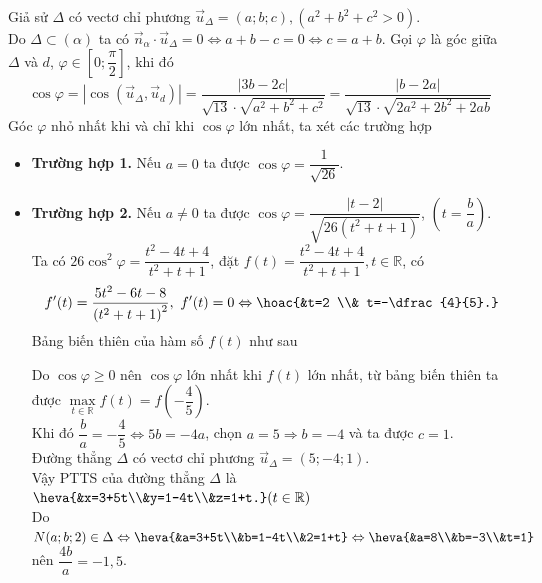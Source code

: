\begin{ex}
{\begin{itemize}
			Giả sử $\Delta$ có vectơ chỉ phương $\overrightarrow{u}_{\Delta}=(a ; b ; c),\left(a^2+b^2+c^2>0\right)$.\\
			Do $\Delta \subset(\alpha)$ ta có $\overrightarrow{n}_\alpha \cdot \overrightarrow{u}_{\Delta}=0 \Leftrightarrow a+b-c=0 \Leftrightarrow c=a+b$.
			Gọi $\varphi$ là góc giữa $\Delta$ và $d$, $\varphi \in\left[0 ; \dfrac{\pi}{2}\right]$, khi đó
			$$
			\cos \varphi=\left|\cos \left(\overrightarrow{u}_{\Delta}, \overrightarrow{u}_d\right)\right|=\dfrac{|3 b-2 c|}{\sqrt{13} \cdot \sqrt{a^2+b^2+c^2}}=\dfrac{|b-2 a|}{\sqrt{13} \cdot \sqrt{2 a^2+2 b^2+2 a b}}
			$$
			Góc $\varphi$ nhỏ nhất khi và chỉ khi $\cos \varphi$ lớn nhất, ta xét các trường hợp
			\begin{itemize}
				\item \textbf{Trường hợp 1.} Nếu $a=0$ ta được $\cos \varphi=\dfrac{1}{\sqrt{26}}$.
				\item \textbf{Trường hợp 2.} Nếu $a \neq 0$ ta được $\cos \varphi=\dfrac{|t-2|}{\sqrt{26\left(t^2+t+1\right)}}$, $\left(t=\dfrac{b}{a}\right)$.\\
				Ta có $26 \cos ^2 \varphi=\dfrac{t^2-4 t+4}{t^2+t+1}$, đặt $f(t)=\dfrac{t^2-4 t+4}{t^2+t+1}, t \in \mathbb{R}$, có
				$$	f'(t)=\dfrac{5 t^2-6 t-8}{\left(t^2+t+1\right)^2},\ f'(t)=0 \Leftrightarrow\hoac{&t=2 \\&	t=-\dfrac{4}{5}.}$$
				Bảng biến thiên của hàm số $f(t)$ như sau
				\begin{center}
				\end{center}
				Do $\cos \varphi \geq 0$ nên $\cos \varphi$ lớn nhất khi $f(t)$ lớn nhất, từ bảng biến thiên ta được $\max\limits_{t \in \mathbb{R}} f(t)=f\left(-\dfrac{4}{5}\right)$.\\
				Khi đó $\dfrac{b}{a}=-\dfrac{4}{5} \Leftrightarrow 5 b=-4 a$, chọn $a=5 \Rightarrow b=-4$ và ta được $c=1$.\\
				Đường thẳng $\Delta$ có vectơ chỉ phương $\overrightarrow{u}_{\Delta}=(5 ;-4 ; 1)$.\\
				Vậy PTTS của đường thẳng $\Delta$ là $\heva{&x=3+5t\\&y=1-4t\\&z=1+t.} (t \in \mathbb{R})$\\
				Do $N(a;b;2) \in \Delta \Leftrightarrow \heva{&a=3+5t\\&b=1-4t\\&2=1+t} \Leftrightarrow\heva{&a=8\\&b=-3\\&t=1} $ nên $\dfrac{4b}{a}=-1{,}5$.
			\end{itemize}
		\end{itemize}
	}
\end{ex}

